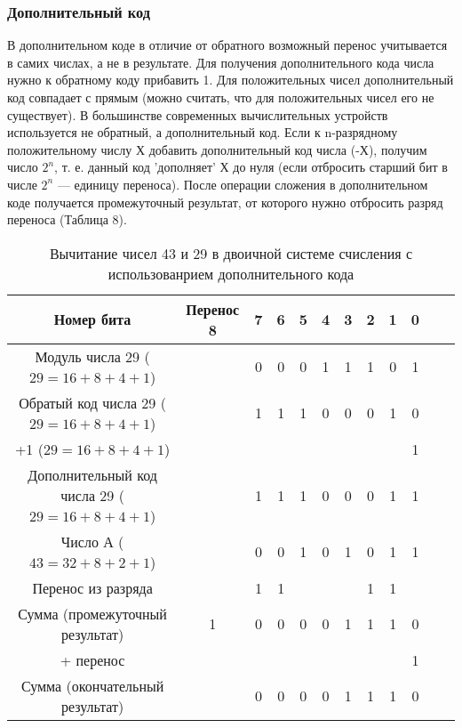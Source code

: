 \documentclass[a4paper]{article}
\begin{document}
\subsubsection{Дополнительный код}
В дополнительном коде в отличие от  обратного возможный перенос учитывается в самих числах, а не в результате. Для получения дополнительного кода числа нужно к обратному коду прибавить 1. Для положительных чисел дополнительный код совпадает с прямым (можно считать, что для положительных чисел его не существует). В большинстве современных вычислительных устройств используется не обратный, а дополнительный код. Если к n-разрядному положительному числу Х добавить дополнительный код числа (-Х), получим число $2^{n}$, т. е. данный код 'дополняет' Х до нуля (если отбросить старший бит в числе $2^{n}$ --- единицу переноса). После операции сложения в дополнительном коде получается промежуточный результат, от которого нужно отбросить разряд переноса (Таблица 8).


\begin{table}\label{tabel:sub_DP}
      \caption{Вычитание чисел 43 и 29 в двоичной системе счисления с использованрием дополнительного кода}
      \begin{center}
      \begin{tabular}{c * {11}{c}}
        \toprule
        Номер бита & Перенос 8 & 7 & 6 & 5 & 4 & 3 & 2 & 1 & 0 \\
        \toprule
        Модуль числа 29 ($29 = 16 + 8 + 4 + 1$) &  & 0 & 0 & 0 & 1 & 1 & 1 & 0 & 1\\
        \midrule
        Обратый код числа 29 ($29 = 16 + 8 + 4 + 1$) &  & 1 & 1 & 1 & 0 & 0 & 0 & 1 & 0\\
        \midrule
        +1 ($29 = 16 + 8 + 4 + 1$) &  &  &  &  &  &  &  &  & 1\\
        \midrule
        Дополнительный код числа 29 ($29 = 16 + 8 + 4 + 1$) &  & 1 & 1 & 1 & 0 & 0 & 0 & 1 & 1\\
        \midrule
        Число А ($43 = 32 + 8 + 2 + 1$) &  & 0 & 0 & 1 & 0 & 1 & 0 & 1 & 1\\
        \midrule
        Перенос из разряда &  & 1 & 1 &  &  &  & 1 & 1 & \\
        \midrule
        Сумма (промежуточный результат) & 1 & 0 & 0 & 0 & 0 & 1 & 1 & 1 & 0 \\
        \midrule
        + перенос &  &  &  &  &  &  &  &  & 1 \\
        \midrule
        Сумма (окончательный результат) &  & 0 & 0 & 0 & 0 & 1 & 1 & 1 & 0 \\
        \bottomrule
      \end{tabular}
    \end{center}
\end{table}
\end{document}
